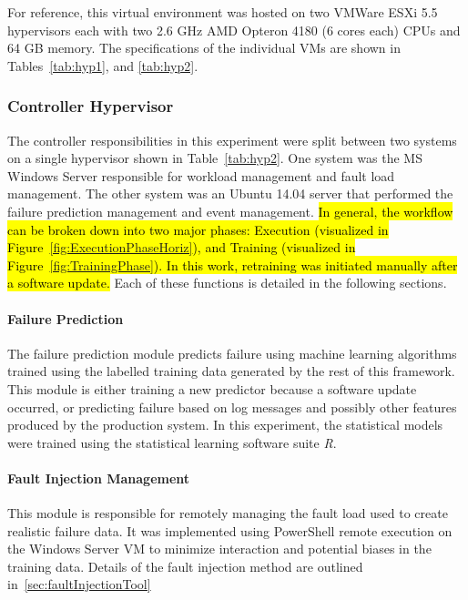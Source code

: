 For reference, this virtual environment was
hosted on two VMWare ESXi 5.5 hypervisors each with two 2.6 \ac{GHz} AMD
Opteron 4180 (6 cores each) \ac{CPU}s and 64 \ac{GB} memory.  The
specifications of the individual \ac{VM}s are shown in Tables~\ref{tab:hyp1},
and \ref{tab:hyp2}.

\tabHypervisorOne
\tabHypervisorTwo

\setcounter{secnumdepth}{5}

\subsubsection{Controller Hypervisor} \label{sec:controller} %
The controller responsibilities in this experiment were split between two
systems on a single hypervisor shown in Table~\ref{tab:hyp2}.  One system was
the \ac{MS} Windows Server responsible for workload management and fault load
management.  The other system was an Ubuntu 14.04 server that performed the
failure prediction management and event management.  \hl{In general, the
workflow can be broken down into two major phases: Execution (visualized in
Figure~\ref{fig:ExecutionPhaseHoriz}), and Training (visualized in
Figure~\ref{fig:TrainingPhase}).  In this work, retraining was initiated
manually after a software update.}  Each of these functions is
detailed in the following sections.


\paragraph{Failure Prediction} \label{sec:failurePrediction} %
The failure prediction module predicts failure using machine learning
algorithms trained using the labelled training data generated by the rest of
this framework.  This module is either training a new predictor
because a software update occurred, or predicting failure based on log messages
and possibly other features produced by the production system.  In this
experiment, the statistical models were trained using the statistical
learning software suite \emph{R}.

\paragraph{Fault Injection Management} \label{sec:faultInjectionMgr}
This module is responsible for remotely managing the fault load used to create
realistic failure data.  It was implemented using PowerShell remote execution
on the Windows Server \ac{VM} to minimize interaction and potential biases in
the training data.  Details of the fault injection method are outlined
in~\ref{sec:faultInjectionTool}

